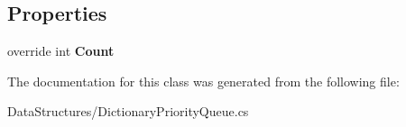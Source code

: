 \subsection*{Properties}
\begin{DoxyCompactItemize}
\item 
\mbox{\label{class_data_structures_1_1_dictionary_priority_queue_a1bd59231ffc3caf8826a8a10bb4fbf03}} 
override int {\bfseries Count}
\end{DoxyCompactItemize}


The documentation for this class was generated from the following file\+:\begin{DoxyCompactItemize}
\item 
Data\+Structures/Dictionary\+Priority\+Queue.\+cs\end{DoxyCompactItemize}
